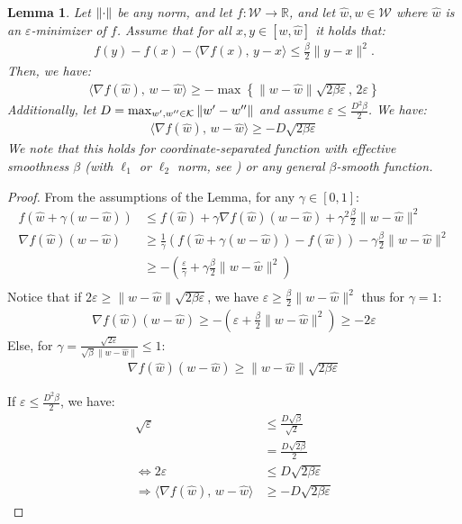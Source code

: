 \documentclass[10pt]{article}
\newtheorem{lemma}[theorem]{Lemma}
\theoremstyle{definition}
\theoremstyle{remark}
\renewcommand{\epsilon}{\varepsilon}
\newcommand{\W}{\mathcal{W}}
\newcommand{\rr}{\mathbb{R}}
\newcommand\inprod[2]{\langle #1,\,#2 \rangle}
\newcommand{\curly}[1]{ {\left\{ #1 \right\}}}
\newcommand{\roundy}[1]{ {\left( #1 \right)}}
\begin{document}
\begin{lemma}\label{lem:epsilon optimality conditions}
Let $\norm{\cdot}$ be any norm, and let $f:\W\to\rr$, and let $\hat{w}, w\in\W$ where $\hat w$ is an $\epsilon$-minimizer of $f$. Assume that for all $x, y\in [w, \hat w]$ it holds that:
\begin{align*}
    f(y) - f(x) - \inprod{\nabla f(x)}{y-x} \le \frac{\beta}{2}\|y-x\|^2.
\end{align*}
Then, we have:
\begin{align*}
    \inprod{\nabla f(\hat w)}{w-\hat{w}} \ge -\max\curly{\|w-\hat{w}\|\sqrt{2\beta\epsilon},\, 2\epsilon}
\end{align*}
Additionally, let $D = \max_{w',w''\in\mathcal K}\|w'-w''\|$ and assume $\epsilon \le \frac{D^2\beta}{2}$. We have:
\begin{align*}
    \inprod{\nabla f(\hat w)}{w-\hat{w}} \ge -D\sqrt{2\beta\epsilon}
\end{align*}
We note that this holds for coordinate-separated function with effective smoothness $\beta$ (with $\ell_1$ or $\ell_2$ norm, see ) or any general $\beta$-smooth function.
\end{lemma}

\begin{proof}
From the assumptions of the Lemma, for any $\gamma \in [0,1]$:
\begin{align*}
    f(\hat{w} + \gamma(w-\hat{w})) &\le f(\hat{w}) + \gamma\nabla f(\hat{w})(w-\hat{w}) + \gamma^2\frac{\beta}{2}\|w-\hat{w}\|^2  \\
    \nabla f(\hat{w})(w-\hat{w}) &\ge \frac{1}{\gamma}\roundy{f(\hat{w} + \gamma(w-\hat{w})) - f(\hat{w})} - \gamma\frac{\beta}{2}\|w-\hat{w}\|^2 \\
    &\ge -\roundy{\frac{\epsilon}{\gamma} + \gamma\frac{\beta}{2}\|w-\hat{w}\|^2} \\
\end{align*}
Notice that if $2\epsilon \ge \|w-\hat{w}\|\sqrt{2\beta\epsilon}$, we have $\epsilon \ge \frac{\beta}{2}\|w-\hat{w}\|^2$ thus for $\gamma = 1$:
\begin{align*}
    \nabla f(\hat{w})(w-\hat{w}) \ge -\roundy{\epsilon + \frac{\beta}{2}\|w-\hat{w}\|^2} \ge -2\epsilon
\end{align*}
Else, for $\gamma = \frac{\sqrt{2\epsilon}}{\sqrt{\beta}\|w-\hat{w}\|} \le 1$:
\begin{align*}
    \nabla f(\hat{w})(w-\hat{w}) \ge \|w-\hat{w}\|\sqrt{2\beta\epsilon}
\end{align*}

If $\epsilon \le \frac{D^2\beta}{2}$, we have:
\begin{align*}
    \sqrt{\epsilon} &\le \frac{D\sqrt{\beta}}{\sqrt{2}}\\
    &= \frac{D\sqrt{2\beta}}{2}\\
    \Leftrightarrow 2\epsilon &\le D\sqrt{2\beta\epsilon} \\
    \Rightarrow \inprod{\nabla f(\hat w)}{w-\hat{w}} &\ge -D\sqrt{2\beta\epsilon}
\end{align*}
\end{proof}
\end{document}
